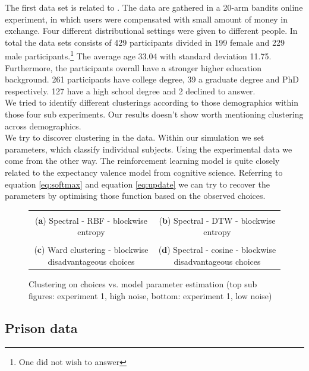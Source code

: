 \documentclass[12pt,a4paper,bibliography=totocnumbered,listof=totocnumbered]{scrartcl}
\begin{document}
The first data set is related to \cite{Stojic2015}. The data are gathered in a 20-arm bandits online experiment, in which users were compensated with small amount of money in exchange. Four different distributional settings were given to different people. In total the data sets consists of 429 participants divided in 199 female and 229 male participants.\footnote{One did not wish to answer} The average age 33.04 with standard deviation 11.75. Furthermore, the participants overall have a stronger higher education background. 261 participants have college degree, 39 a graduate degree and PhD respectively. 127 have a high school degree and 2 declined to answer.\\
We tried to identify different clusterings according to those demographics within those four sub experiments. Our results doesn't show worth mentioning clustering across demographics.\\
We try to discover clustering in the data. Within our simulation we set parameters, which classify individual subjects. Using the experimental data we come from the other way. The reinforcement learning model is quite closely related to the expectancy valence model from cognitive science. Referring to equation \eqref{eq:softmax} and equation \eqref{eq:update} we can try to recover the parameters by optimising those function based on the observed choices. 

\begin{figure}[H]
	\centering
	\small
	\hspace*{-0.7in}
	\begin{tabular}{cc}
		 &  \\
		(\textbf{a}) Spectral - RBF - blockwise entropy & (\textbf{b}) Spectral - DTW - blockwise entropy \\
			 &  \\
			(\textbf{c}) Ward clustering - blockwise disadvantageous choices & (\textbf{d}) Spectral - cosine - blockwise disadvantageous choices 
	\end{tabular} \quad
	\caption{Clustering on choices vs. model parameter estimation (top sub figures: experiment 1, high noise, bottom: experiment 1, low noise)}
	\label{fig:cluse1c2}
\end{figure}




\subsection{Prison data}
\end{document}
